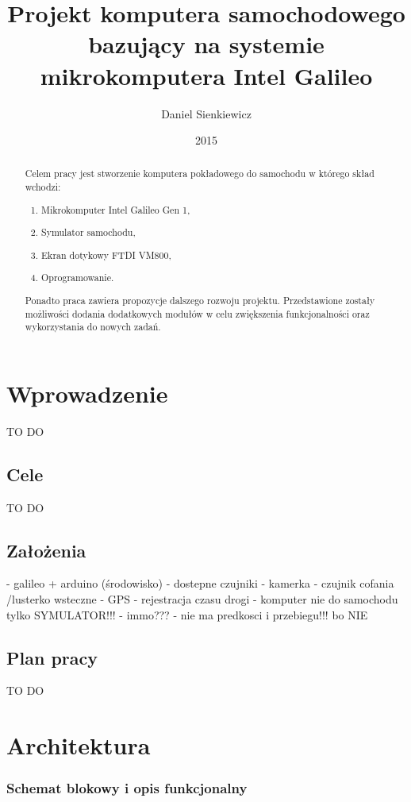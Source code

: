\documentclass{xmgr}
\author   {Daniel Sienkiewicz}
\title    {Projekt komputera samochodowego bazujący na systemie mikrokomputera Intel Galileo}
\date     {2015}
\begin{document}
\begin{abstract}
Celem pracy jest stworzenie komputera pokładowego do samochodu w którego skład wchodzi: \begin{enumerate}
\item Mikrokomputer Intel Galileo Gen 1, 
\item Symulator samochodu, 
\item Ekran dotykowy FTDI VM800, 
\item Oprogramowanie.
\end{enumerate}

Ponadto praca zawiera propozycje dalszego rozwoju projektu. Przedstawione zostały możliwości dodania dodatkowych modułów w celu zwiększenia funkcjonalności oraz wykorzystania do nowych zadań.
\end{abstract}
\maketitle

\chapter{Wprowadzenie}
TO DO
\section{Cele}
TO DO
\section{Założenia}
- galileo + arduino (środowisko)
- dostepne czujniki
- kamerka - czujnik cofania /lusterko wsteczne
- GPS - rejestracja czasu drogi
- komputer nie do samochodu tylko SYMULATOR!!!
- immo???
- nie ma predkosci i przebiegu!!! bo NIE
\section{Plan pracy}
TO DO

\chapter{Architektura}
\subsection{Schemat blokowy i opis funkcjonalny}
\end{document}
